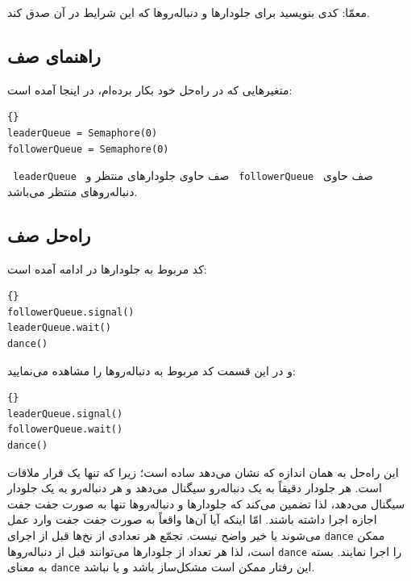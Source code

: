 \documentclass{book}
\newcommand{\clearemptydoublepage}{\newpage\cleardoublepage}
\begin{document}
    معمّا:  کدی بنویسید برای جلو‌دارها و دنباله‌رو‌ها که این شرایط در آن صدق کند.


\clearemptydoublepage
\subsection {راهنمای صف}

    متغیرهایی که در راه‌حل خود بکار برده‌ام، در اینجا آمده است:

\begin{latin}
\begin{lstlisting}[title=\rl{راهنمای صف}]{}
leaderQueue = Semaphore(0)
followerQueue = Semaphore(0)
\end{lstlisting}
\end{latin}

\texttt{ leaderQueue }     صف حاوی جلو‌دارهای منتظر و
\texttt{  followerQueue } صف حاوی دنباله‌رو‌های منتظر می‌باشد.



\clearemptydoublepage
\subsection {راه‌حل صف}

    کد مربوط به جلو‌دارها در ادامه آمده است:

\begin{latin}
\begin{lstlisting}[title=\rl{راه‌حل صف (جلودارها)}]{}
followerQueue.signal()
leaderQueue.wait()
dance()
\end{lstlisting}
\end{latin}

    و در این قسمت کد مربوط به دنباله‌روها را مشاهده می‌نمایید:

\begin{latin}
\begin{lstlisting}[title=\rl{راه‌حل صف (دنباله‌روها)}]{}
leaderQueue.signal()
followerQueue.wait()
dance()
\end{lstlisting}
\end{latin}
    این راه‌حل به همان اندازه که نشان می‌دهد ساده‌ است؛ زیرا که تنها یک قرار ملاقات است.
    هر جلودار دقیقاً به یک دنباله‌رو سیگنال می‌دهد و هر دنباله‌رو به یک جلودار سیگنال می‌دهد، لذا تضمین می‌کند که جلو‌دارها و دنباله‌روها تنها 
    به صورت جفت جفت اجازه اجرا داشته باشند.  امّا اینکه آیا آ‌ن‌ها واقعاً به صورت جفت جفت وارد عمل می‌شوند یا خیر واضح نیست. 
    تجمّع هر تعدادی از نخ‌ها     قبل از اجرای \texttt{dance} ممکن است، لذا هر تعداد از جلودارها می‌توانند قبل از دنباله‌روها  \texttt{dance} را اجرا نمایند. 
    بسته به معنای \texttt{dance} این رفتار ممکن است مشکل‌ساز باشد و یا نباشد. 
\end{document}
